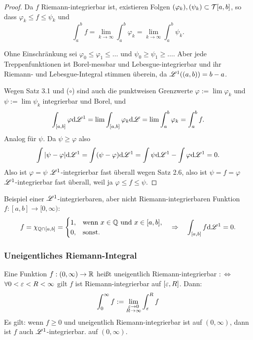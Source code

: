 \begin{proof}
 Da $f$ Riemann-integrierbar ist, existieren Folgen $(\varphi_k), (\psi_k) \subset \mathcal{T}[a,b]$, so dass $\varphi_k \le f \le \psi_k$ und
 \[ \int_a^b f = \lim_{k\to\infty} \int_a^b \varphi_k = \lim_{k\to\infty} \int_a^b \psi_k. \tag{$\circ$} \]

 Ohne Einschränkung sei $\varphi_0 \le \varphi_1 \le \ldots$ und $\psi_0 \ge \psi_1 \ge \ldots$. Aber jede Treppenfunktionen ist Borel-messbar und Lebesgue-integrierbar und ihr Riemann- und Lebesgue-Integral stimmen überein, da $\mathscr{L}^1( (a,b) ) = b - a$.

 Wegen Satz 3.1 und ($\circ$) sind auch die punktweisen Grenzwerte $\varphi := \lim \varphi_k$ und $\psi := \lim \psi_k$ integrierbar und Borel, und
 \[ \int_{[a,b]} \varphi \mathrm{d} \mathscr{L}^1 = \lim \int_{[a,b]} \varphi_k \mathrm{d} \mathscr{L} = \lim \int_a^b \varphi_k = \int_a^b f. \]
 Analog für $\psi$. Da $\psi \ge \varphi$ also
 \[ \int | \psi - \varphi | \mathrm{d} \mathscr{L}^1 = \int (\psi - \varphi) \mathrm{d} \mathscr{L}^1 = \int \psi \mathrm{d} \mathscr{L}^1 - \int \varphi \mathrm{d} \mathscr{L}^1 = 0. \]
 Also ist $\varphi = \psi$ $\mathscr{L}^1$-integrierbar fast überall wegen Satz 2.6, also ist $\psi = f = \varphi$ $\mathscr{L}^1$-integrierbar fast überall, weil ja $\varphi \le f \le \psi$.
\end{proof}

Beispiel einer $\mathscr{L}^1$-integrierbaren, aber nicht Riemann-integrierbaren Funktion $f:[a,b] \to [0,\infty)$:
\[ f = \chi_{\mathbb{Q} \cap [a,b]} = \begin{cases} 1, &\text{wenn } x \in \mathbb{Q} \text{ und } x \in [a,b], \\
                                 0, &\text{sonst.}
                                \end{cases}
   \quad \Rightarrow \quad \int_{[a,b]} f \mathrm{d} \mathscr{L}^1 = 0. \]
   
\subsubsection*{Uneigentliches Riemann-Integral}
Eine Funktion $f:(0,\infty) \to \mathbb{R}$ heißt uneigentlich Riemann-integrierbar $:\Leftrightarrow$ $\forall 0 < \varepsilon < R < \infty$ gilt $f$ ist Riemann-integrierbar auf $[\varepsilon,R]$. Dann:
\[ \int_0^\infty f := \lim_{\substack{\varepsilon \to 0 \\ R \to \infty}} \int_\varepsilon^R f \]
Es gilt: wenn $f \ge 0$ und uneigentlich Riemann-integrierbar ist auf $(0,\infty)$, dann ist $f$ auch $\mathscr{L}^1$-integrierbar. auf $(0,\infty)$.

